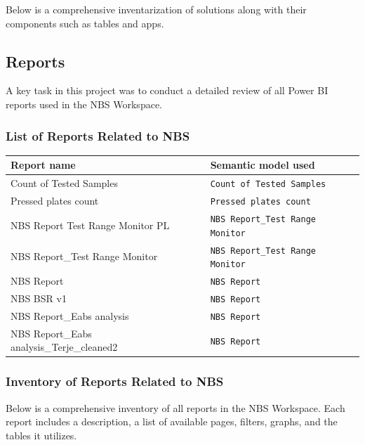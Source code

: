 Below is a comprehensive inventarization of solutions along with their components such as tables and apps.



\subsection{Reports}

A key task in this project was to conduct a detailed review of all Power BI reports used in the NBS Workspace.

\subsubsection{List of Reports Related to NBS}

\begin{small}
	\begin{tabularx}{\textwidth}{l|l}
		\textbf{Report name} & \textbf{Semantic model used} \\
		\hline
		Count of Tested Samples & \texttt{Count of Tested Samples} \\
		Pressed plates count & \texttt{Pressed plates count} \\
		NBS Report Test Range Monitor PL & \texttt{NBS Report\_Test Range Monitor} \\
		NBS Report\_Test Range Monitor & \texttt{NBS Report\_Test Range Monitor} \\
		NBS Report & \texttt{NBS Report} \\
		NBS BSR v1 & \texttt{NBS Report} \\
		NBS Report\_Eabs analysis & \texttt{NBS Report} \\
		NBS Report\_Eabs analysis\_Terje\_cleaned2 & \texttt{NBS Report} \\
	\end{tabularx}
\end{small}

\subsubsection{Inventory of Reports Related to NBS}

Below is a comprehensive inventory of all reports in the NBS Workspace. Each report includes a description, a list of available pages, filters, graphs, and the tables it utilizes.

